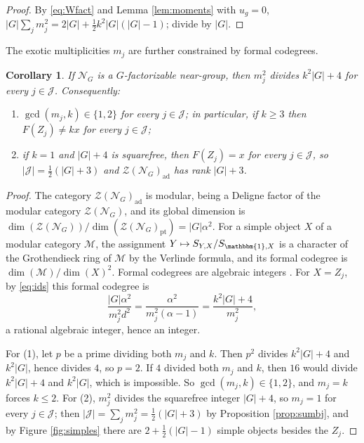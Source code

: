 \documentclass[10pt]{article}
\theoremstyle{plain}
\newtheorem{corollary}[theorem]{Corollary}
\theoremstyle{definition}
\theoremstyle{plain}
\begin{document}
\begin{proof}
By \eqref{eq:Wfact} and Lemma \ref{lem:moments} with $u_g=0$, $|G|\sum_jm_j^2=2|G|+\frac12k^2|G|(|G|-1)$; divide by $|G|$.
\end{proof}

The exotic multiplicities $m_j$ are further constrained by formal codegrees.

\begin{corollary}\label{cor:codeg}
If $\mathcal{N}_G$ is a $G$-factorizable near-group, then $m_j^2$ divides $k^2|G|+4$ for every $j\in\mathcal{J}$. Consequently:
\begin{enumerate}
\item $\gcd(m_j,k)\in\{1,2\}$ for every $j\in\mathcal{J}$; in particular, if $k\geq3$ then $F(Z_j)\neq kx$ for every $j\in\mathcal{J}$;
\item if $k=1$ and $|G|+4$ is squarefree, then $F(Z_j)=x$ for every $j\in\mathcal{J}$, so $|\mathcal{J}|=\frac12(|G|+3)$ and $\mathcal{Z}(\mathcal{N}_G)_\mathrm{ad}$ has rank $|G|+3$.
\end{enumerate}
\end{corollary}

\begin{proof}
The category $\mathcal{Z}(\mathcal{N}_G)_\mathrm{ad}$ is modular, being a Deligne factor of the modular category $\mathcal{Z}(\mathcal{N}_G)$, and its global dimension is $\dim(\mathcal{Z}(\mathcal{N}_G))/\dim(\mathcal{Z}(\mathcal{N}_G)_\mathrm{pt})=|G|\alpha^2$. For a simple object $X$ of a modular category $\mathcal{M}$, the assignment $Y\mapsto S_{Y,X}/S_{\mathbbm{1},X}$ is a character of the Grothendieck ring of $\mathcal{M}$ by the Verlinde formula, and its formal codegree is $\dim(\mathcal{M})/\dim(X)^2$. Formal codegrees are algebraic integers \cite[Theorem 1.2]{MR2576705}. For $X=Z_j$, by \eqref{eq:ids} this formal codegree is
\[
\frac{|G|\alpha^2}{m_j^2d^2}=\frac{\alpha^2}{m_j^2(\alpha-1)}=\frac{k^2|G|+4}{m_j^2},
\]
a rational algebraic integer, hence an integer.

For (1), let $p$ be a prime dividing both $m_j$ and $k$. Then $p^2$ divides $k^2|G|+4$ and $k^2|G|$, hence divides $4$, so $p=2$. If $4$ divided both $m_j$ and $k$, then $16$ would divide $k^2|G|+4$ and $k^2|G|$, which is impossible. So $\gcd(m_j,k)\in\{1,2\}$, and $m_j=k$ forces $k\leq2$. For (2), $m_j^2$ divides the squarefree integer $|G|+4$, so $m_j=1$ for every $j\in\mathcal{J}$; then $|\mathcal{J}|=\sum_jm_j^2=\frac12(|G|+3)$ by Proposition \ref{prop:sumbj}, and by Figure \ref{fig:simples} there are $2+\frac12(|G|-1)$ simple objects besides the $Z_j$.
\end{proof}
\end{document}
